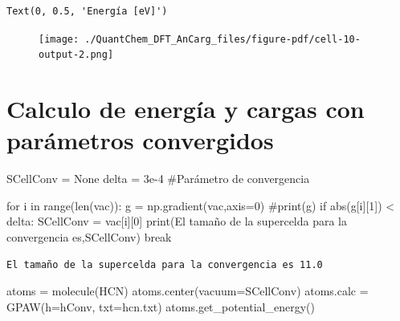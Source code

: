 \documentclass[
  letterpaper,
  DIV=11,
  numbers=noendperiod]{scrreprt}
\newenvironment{Shaded}{\begin{snugshade}}{\end{snugshade}}
\newcommand{\BuiltInTok}[1]{\textcolor[rgb]{0.00,0.23,0.31}{#1}}
\newcommand{\CommentTok}[1]{\textcolor[rgb]{0.37,0.37,0.37}{#1}}
\newcommand{\ControlFlowTok}[1]{\textcolor[rgb]{0.00,0.23,0.31}{#1}}
\newcommand{\DecValTok}[1]{\textcolor[rgb]{0.68,0.00,0.00}{#1}}
\newcommand{\FloatTok}[1]{\textcolor[rgb]{0.68,0.00,0.00}{#1}}
\newcommand{\KeywordTok}[1]{\textcolor[rgb]{0.00,0.23,0.31}{#1}}
\newcommand{\NormalTok}[1]{\textcolor[rgb]{0.00,0.23,0.31}{#1}}
\newcommand{\OperatorTok}[1]{\textcolor[rgb]{0.37,0.37,0.37}{#1}}
\newcommand{\StringTok}[1]{\textcolor[rgb]{0.13,0.47,0.30}{#1}}
\newcommand{\VariableTok}[1]{\textcolor[rgb]{0.07,0.07,0.07}{#1}}
\begin{document}
\begin{verbatim}
Text(0, 0.5, 'Energía [eV]')
\end{verbatim}

\begin{figure}[H]

{\centering \texttt{[image: ./QuantChem\_DFT\_AnCarg\_files/figure-pdf/cell-10-output-2.png]}

}

\end{figure}

\hypertarget{calculo-de-energuxeda-y-cargas-con-paruxe1metros-convergidos}{%
\section{Calculo de energía y cargas con parámetros
convergidos}\label{calculo-de-energuxeda-y-cargas-con-paruxe1metros-convergidos}}

\begin{Shaded}
\begin{Highlighting}[]
\NormalTok{SCellConv }\OperatorTok{=} \VariableTok{None}
\NormalTok{delta }\OperatorTok{=} \FloatTok{3e{-}4} \CommentTok{\#Parámetro de convergencia}

\ControlFlowTok{for}\NormalTok{ i }\KeywordTok{in} \BuiltInTok{range}\NormalTok{(}\BuiltInTok{len}\NormalTok{(vac)):}
\NormalTok{  g }\OperatorTok{=}\NormalTok{ np.gradient(vac,axis}\OperatorTok{=}\DecValTok{0}\NormalTok{)}
  \CommentTok{\#print(g)}
  \ControlFlowTok{if} \BuiltInTok{abs}\NormalTok{(g[i][}\DecValTok{1}\NormalTok{]) }\OperatorTok{\textless{}}\NormalTok{ delta:}
\NormalTok{    SCellConv }\OperatorTok{=}\NormalTok{ vac[i][}\DecValTok{0}\NormalTok{]}
    \BuiltInTok{print}\NormalTok{(}\StringTok{\textquotesingle{}El tamaño de la supercelda para la convergencia es\textquotesingle{}}\NormalTok{,SCellConv)}
    \ControlFlowTok{break}
\end{Highlighting}
\end{Shaded}

\begin{verbatim}
El tamaño de la supercelda para la convergencia es 11.0
\end{verbatim}

\begin{Shaded}
\begin{Highlighting}[]
\NormalTok{atoms }\OperatorTok{=}\NormalTok{ molecule(}\StringTok{\textquotesingle{}HCN\textquotesingle{}}\NormalTok{)}
\NormalTok{atoms.center(vacuum}\OperatorTok{=}\NormalTok{SCellConv)}
\NormalTok{atoms.calc }\OperatorTok{=}\NormalTok{ GPAW(h}\OperatorTok{=}\NormalTok{hConv, txt}\OperatorTok{=}\StringTok{\textquotesingle{}hcn.txt\textquotesingle{}}\NormalTok{)}
\NormalTok{atoms.get\_potential\_energy()}
\end{Highlighting}
\end{Shaded}
\end{document}
